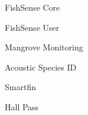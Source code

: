 \item FishSense Core
\item FishSense User
\item Mangrove Monitoring
\item Acoustic Species ID
\item Smartfin
\item Hall Pass
